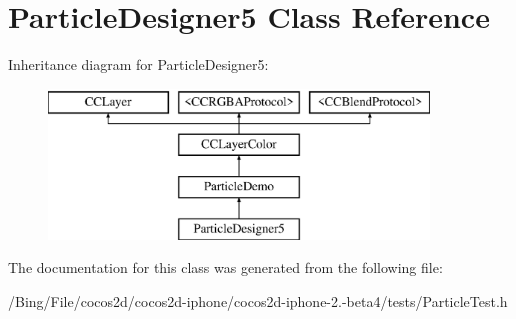 \hypertarget{interface_particle_designer5}{\section{Particle\-Designer5 Class Reference}
\label{interface_particle_designer5}
}
Inheritance diagram for Particle\-Designer5\-:\begin{figure}[H]
\begin{center}
\leavevmode
\includegraphics[height=4.000000cm]{interface_particle_designer5}
\end{center}
\end{figure}


The documentation for this class was generated from the following file\-:\begin{DoxyCompactItemize}
\item 
/\-Bing/\-File/cocos2d/cocos2d-\/iphone/cocos2d-\/iphone-\/2.-\/beta4/tests/Particle\-Test.\-h\end{DoxyCompactItemize}
